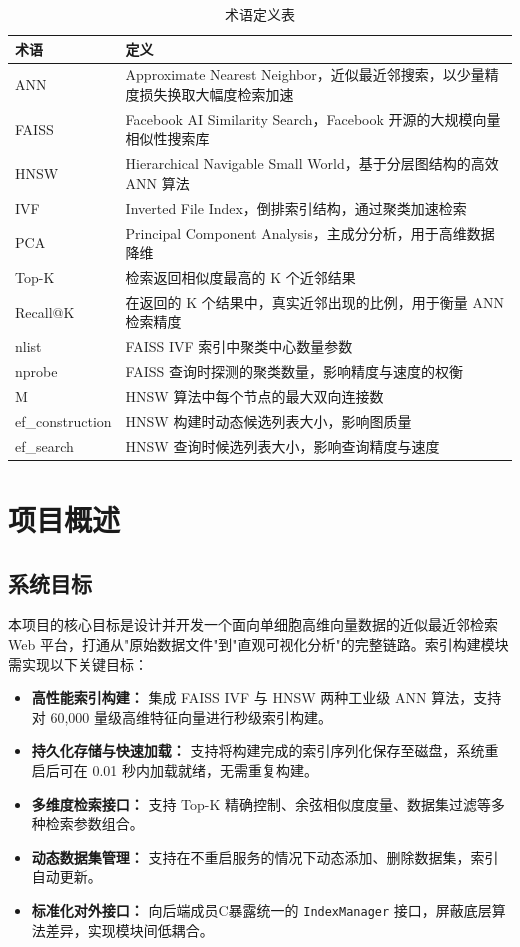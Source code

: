 \documentclass[a4paper]{article}
\begin{document}
\begin{table}[H]
\centering
\small
\caption{术语定义表}
\begin{tabularx}{\linewidth}{p{3cm}X}
\toprule
术语 & 定义 \\
\midrule
ANN & Approximate Nearest Neighbor，近似最近邻搜索，以少量精度损失换取大幅度检索加速 \\
FAISS & Facebook AI Similarity Search，Facebook 开源的大规模向量相似性搜索库 \\
HNSW & Hierarchical Navigable Small World，基于分层图结构的高效 ANN 算法 \\
IVF & Inverted File Index，倒排索引结构，通过聚类加速检索 \\
PCA & Principal Component Analysis，主成分分析，用于高维数据降维 \\
Top-K & 检索返回相似度最高的 K 个近邻结果 \\
Recall@K & 在返回的 K 个结果中，真实近邻出现的比例，用于衡量 ANN 检索精度 \\
nlist & FAISS IVF 索引中聚类中心数量参数 \\
nprobe & FAISS 查询时探测的聚类数量，影响精度与速度的权衡 \\
M & HNSW 算法中每个节点的最大双向连接数 \\
ef\_construction & HNSW 构建时动态候选列表大小，影响图质量 \\
ef\_search & HNSW 查询时候选列表大小，影响查询精度与速度 \\
\bottomrule
\end{tabularx}
\end{table}

\section{项目概述}

\subsection{系统目标}
本项目的核心目标是设计并开发一个面向单细胞高维向量数据的近似最近邻检索 Web 平台，打通从"原始数据文件"到"直观可视化分析"的完整链路。索引构建模块需实现以下关键目标：

\begin{itemize}
    \item \textbf{高性能索引构建：} 集成 FAISS IVF 与 HNSW 两种工业级 ANN 算法，支持对 60,000 量级高维特征向量进行秒级索引构建。
    \item \textbf{持久化存储与快速加载：} 支持将构建完成的索引序列化保存至磁盘，系统重启后可在 0.01 秒内加载就绪，无需重复构建。
    \item \textbf{多维度检索接口：} 支持 Top-K 精确控制、余弦相似度度量、数据集过滤等多种检索参数组合。
    \item \textbf{动态数据集管理：} 支持在不重启服务的情况下动态添加、删除数据集，索引自动更新。
    \item \textbf{标准化对外接口：} 向后端成员C暴露统一的 \texttt{IndexManager} 接口，屏蔽底层算法差异，实现模块间低耦合。
\end{itemize}
\end{document}

